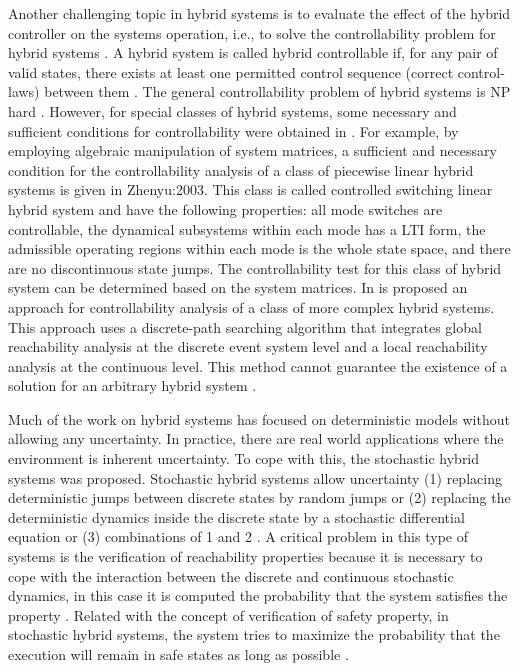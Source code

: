 Another challenging topic in hybrid systems is to evaluate the effect
of the hybrid controller on the systems operation, i.e., to solve the
controllability problem for hybrid systems \cite{Stikkel:2004}. A
hybrid system is called hybrid controllable if, for any pair of valid
states, there exists at least one permitted control sequence (correct
control-laws) between them \cite{Tittus:1998,Yang:2007}. The general
controllability problem of hybrid systems is NP
hard \cite{Blondel:1999}. However, for special classes of hybrid
systems, some necessary and sufficient conditions for controllability
were obtained
in \cite{Stikkel:2004,Lemch:2001,Sun:2002,Zhenyu:2003,Yang:2007}.  For
example, by employing algebraic manipulation of system matrices, a
sufficient and necessary condition for the controllability analysis of
a class of piecewise linear hybrid systems is given in
{Zhenyu:2003}. This class is called controlled switching linear hybrid
system and have the following properties: all mode switches are
controllable, the dynamical subsystems within each mode has a LTI
form, the admissible operating regions within each mode is the whole
state space, and there are no discontinuous state jumps. The
controllability test for this class of hybrid system can be determined
based on the system matrices. In \cite{Yang:2007} is proposed an
approach for controllability analysis of a class of more complex
hybrid systems. This approach uses a discrete-path searching algorithm
that integrates global reachability analysis at the discrete event
system level and a local reachability analysis at the continuous
level. This method cannot guarantee the existence of a solution for an
arbitrary hybrid system \cite{Yang:2007}.

Much of the work on hybrid systems has focused on deterministic models
without allowing any uncertainty. In practice, there are real world
applications where the environment is inherent uncertainty. To cope
with this, the stochastic hybrid systems was proposed. Stochastic
hybrid systems allow uncertainty (1) replacing deterministic jumps
between discrete states by random jumps or (2) replacing the
deterministic dynamics inside the discrete state by a stochastic
differential equation or (3) combinations of 1 and 2 \cite{Hu:2000}. A
critical problem in this type of systems is the verification of
reachability properties because it is necessary to cope with the
interaction between the discrete and continuous stochastic dynamics,
in this case it is computed the probability that the system satisfies
the property \cite{Koutsoukos:2006}.  Related with the concept of
verification of safety property, in stochastic hybrid systems, the
system tries to maximize the probability that the execution will
remain in safe states as long as possible \cite{Hu:2000}.

